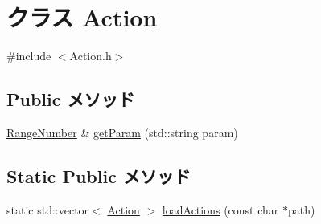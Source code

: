 \hypertarget{class_action}{\section{クラス Action}
\label{class_action}
}


{\ttfamily \#include $<$Action.\-h$>$}

\subsection*{Public メソッド}
\begin{DoxyCompactItemize}
\item 
\hyperlink{struct_range_number}{Range\-Number} \& \hyperlink{class_action_a79c381c98d9af3f634e953fbafdd1f2c}{get\-Param} (std\-::string param)
\end{DoxyCompactItemize}
\subsection*{Static Public メソッド}
\begin{DoxyCompactItemize}
\item 
static std\-::vector$<$ \hyperlink{class_action}{Action} $>$ \hyperlink{class_action_a5039dbfdd5fd74ee6e933653a2e8fc24}{load\-Actions} (const char $\ast$path)
\end{DoxyCompactItemize}
